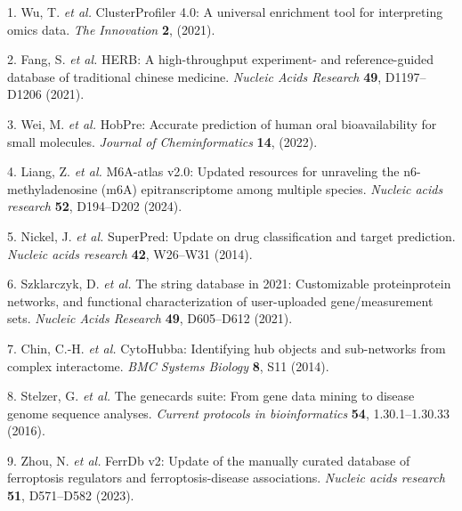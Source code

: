 \documentclass[
]{article}
\newenvironment{cslreferences}%
  {}%
  {\par}
\begin{document}
\hypertarget{refs}{}
\begin{cslreferences}
\leavevmode\hypertarget{ref-ClusterprofilerWuTi2021}{}%
1. Wu, T. \emph{et al.} ClusterProfiler 4.0: A universal enrichment tool for interpreting omics data. \emph{The Innovation} \textbf{2}, (2021).

\leavevmode\hypertarget{ref-HerbAHighThFang2021}{}%
2. Fang, S. \emph{et al.} HERB: A high-throughput experiment- and reference-guided database of traditional chinese medicine. \emph{Nucleic Acids Research} \textbf{49}, D1197--D1206 (2021).

\leavevmode\hypertarget{ref-HobpreAccuratWeiM2022}{}%
3. Wei, M. \emph{et al.} HobPre: Accurate prediction of human oral bioavailability for small molecules. \emph{Journal of Cheminformatics} \textbf{14}, (2022).

\leavevmode\hypertarget{ref-M6aAtlasV20Liang2024}{}%
4. Liang, Z. \emph{et al.} M6A-atlas v2.0: Updated resources for unraveling the n6-methyladenosine (m6A) epitranscriptome among multiple species. \emph{Nucleic acids research} \textbf{52}, D194--D202 (2024).

\leavevmode\hypertarget{ref-SuperpredUpdaNickel2014}{}%
5. Nickel, J. \emph{et al.} SuperPred: Update on drug classification and target prediction. \emph{Nucleic acids research} \textbf{42}, W26--W31 (2014).

\leavevmode\hypertarget{ref-TheStringDataSzklar2021}{}%
6. Szklarczyk, D. \emph{et al.} The string database in 2021: Customizable proteinprotein networks, and functional characterization of user-uploaded gene/measurement sets. \emph{Nucleic Acids Research} \textbf{49}, D605--D612 (2021).

\leavevmode\hypertarget{ref-CytohubbaIdenChin2014}{}%
7. Chin, C.-H. \emph{et al.} CytoHubba: Identifying hub objects and sub-networks from complex interactome. \emph{BMC Systems Biology} \textbf{8}, S11 (2014).

\leavevmode\hypertarget{ref-TheGenecardsSStelze2016}{}%
8. Stelzer, G. \emph{et al.} The genecards suite: From gene data mining to disease genome sequence analyses. \emph{Current protocols in bioinformatics} \textbf{54}, 1.30.1--1.30.33 (2016).

\leavevmode\hypertarget{ref-FerrdbV2UpdaZhou2023}{}%
9. Zhou, N. \emph{et al.} FerrDb v2: Update of the manually curated database of ferroptosis regulators and ferroptosis-disease associations. \emph{Nucleic acids research} \textbf{51}, D571--D582 (2023).
\end{cslreferences}
\end{document}
